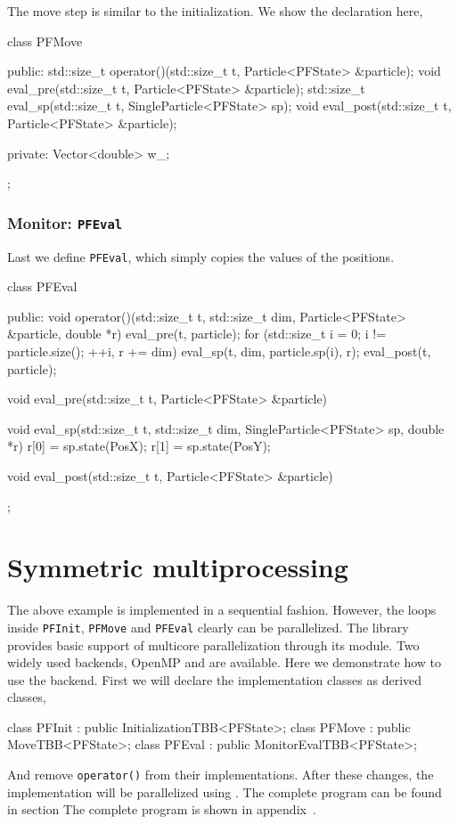 The move step is similar to the initialization. We show the declaration here,
\begin{cppcode}
  class PFMove
  {
      public:
      std::size_t operator()(std::size_t t, Particle<PFState> &particle);
      void eval_pre(std::size_t t, Particle<PFState> &particle);
      std::size_t eval_sp(std::size_t t, SingleParticle<PFState> sp);
      void eval_post(std::size_t t, Particle<PFState> &particle);

      private:
      Vector<double> w_;
  };
\end{cppcode}

\subsubsection{Monitor: \texttt{PFEval}}

Last we define \verb|PFEval|, which simply copies the values of the positions.
\begin{cppcode}
  class PFEval
  {
      public:
      void operator()(std::size_t t, std::size_t dim,
          Particle<PFState> &particle, double *r)
      {
          eval_pre(t, particle);
          for (std::size_t i = 0; i != particle.size(); ++i, r += dim)
              eval_sp(t, dim, particle.sp(i), r);
          eval_post(t, particle);
      }

      void eval_pre(std::size_t t, Particle<PFState> &particle) {}

      void eval_sp(std::size_t t, std::size_t dim,
          SingleParticle<PFState> sp, double *r)
      {
          r[0] = sp.state(PosX);
          r[1] = sp.state(PosY);
      }

      void eval_post(std::size_t t, Particle<PFState> &particle) {}
  };
\end{cppcode}

\section{Symmetric multiprocessing}
\label{sec:Symmetric multiprocessing}

The above example is implemented in a sequential fashion. However, the loops
inside \verb|PFInit|, \verb|PFMove| and \verb|PFEval| clearly can be
parallelized. The library provides basic support of multicore parallelization
through its \smp module. Two widely used backends, OpenMP and \tbb are
available. Here we demonstrate how to use the \tbb backend. First we will
declare the implementation classes as derived classes,
\begin{cppcode}
  class PFInit : public InitializationTBB<PFState>;
  class PFMove : public MoveTBB<PFState>;
  class PFEval : public MonitorEvalTBB<PFState>;
\end{cppcode}
And remove \verb|operator()| from their implementations. After these changes,
the implementation will be parallelized using \tbb. The complete program can be
found in section The complete program is shown in
appendix~.

